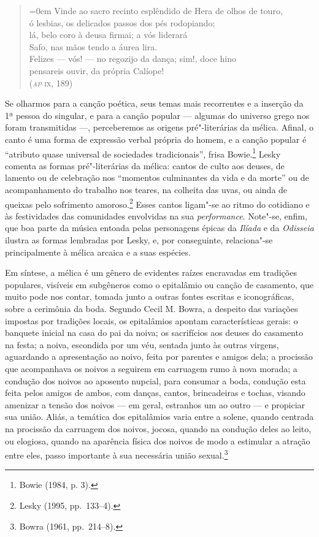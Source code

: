 \begin{quote}\parindent=0em 
Vinde ao sacro recinto esplêndido de Hera de olhos de touro,\\
\hspace*{4.5em} ó lesbias, os delicados passos dos pés rodopiando;\\
lá, belo coro à deusa firmai; a vós liderará\\
\hspace*{4.5em} Safo, nas mãos tendo a áurea lira.\\
Felizes --- vós! --- no regozijo da dança; sim!, doce hino\\
\hspace*{4.5em} pensareis ouvir, da própria Calíope!\\
\mbox{}\hfill{}(\textsc{\textit{ap} ix}, 189)
\end{quote}

Se olharmos para a canção poética, seus temas mais recorrentes e a inserção da
1ª pessoa do singular, e para a canção popular --- algumas do universo grego nos
foram transmitidas ---, perceberemos as origens pré"-literárias da mélica. Afinal,
o canto é uma forma de expressão verbal própria do homem, e a canção popular é
“atributo quase universal de sociedades tradicionais”, frisa Bowie.\footnote{
Bowie (1984, p. 3).} Lesky comenta as formas
pré"-literárias da mélica: cantos de culto aos deuses, de lamento ou de celebração
nos “momentos culminantes da vida e da morte” ou de acompanhamento do trabalho nos teares, na colheita das uvas, ou ainda de queixas pelo sofrimento amoroso.\footnote{ Lesky (1995, pp.~133--4).} Esses cantos ligam"-se ao ritmo do
cotidiano e às festividades das comunidades envolvidas na sua
\textit{performance}. Note"-se, enfim, que boa parte da música entoada pelas
personagens épicas da \textit{Ilíada} e da \textit{Odisseia} ilustra as formas
lembradas por Lesky, e, por conseguinte, relaciona"-se principalmente à mélica
arcaica e a suas espécies.

Em síntese, a mélica é um gênero de evidentes raízes
encravadas em tradições populares, visíveis em subgêneros
como o epitalâmio ou canção de casamento, que muito pode nos contar, tomada
junto a outras fontes escritas e iconográficas, sobre a cerimônia
da boda. Segundo Cecil M. Bowra, a despeito das variações
impostas por tradições locais, os epitalâmios apontam características gerais:
o banquete inicial na casa do pai da noiva; os sacrifícios aos
deuses do casamento na festa; a noiva, escondida por um véu, sentada junto às
outras virgens, aguardando a apresentação ao noivo, feita por parentes e amigos
dela; a procissão que acompanhava os noivos a seguirem em carruagem rumo à nova
morada; a condução dos noivos ao aposento nupcial, para consumar a boda,
condução esta feita pelos amigos de ambos, com danças, cantos, brincadeiras e
tochas, visando amenizar a tensão dos noivos --- em geral, estranhos um ao outro
--- e propiciar sua união. Aliás, a temática dos epitalâmios varia entre a
solene, quando centrada na procissão da carruagem dos noivos, jocosa, quando na
condução deles ao leito, ou elogiosa, quando na aparência física dos noivos de
modo a estimular a atração entre eles, passo importante à sua necessária união
sexual.\footnote{ Bowra (1961, pp.~214--8).}

